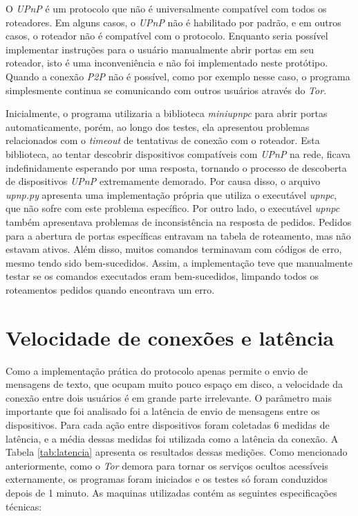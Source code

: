 O \textit{UPnP} é um protocolo que não é universalmente compatível com todos os roteadores. Em alguns casos, o \textit{UPnP} não é habilitado por padrão, e em outros casos, o roteador não é compatível com o protocolo. Enquanto seria possível implementar instruções para o usuário manualmente abrir portas em seu roteador, isto é uma inconveniência e não foi implementado neste protótipo. Quando a conexão \textit{P2P} não é possível, como por exemplo nesse caso, o programa simplesmente continua se comunicando com outros usuários através do \textit{Tor}.

Inicialmente, o programa utilizaria a biblioteca \textit{miniupnpc} para abrir portas automaticamente, porém, ao longo dos testes, ela apresentou problemas relacionados com o \textit{timeout} de tentativas de conexão com o roteador. Esta biblioteca, ao tentar descobrir dispositivos compatíveis com \textit{UPnP} na rede, ficava indefinidamente esperando por uma resposta, tornando o processo de descoberta de dispositivos \textit{UPnP} extremamente demorado. Por causa disso, o arquivo \textit{upnp.py} apresenta uma implementação própria que utiliza o executável \textit{upnpc}, que não sofre com este problema específico. Por outro lado, o executável \textit{upnpc} também apresentava problemas de inconsistência na resposta de pedidos. Pedidos para a abertura de portas específicas entravam na tabela de roteamento, mas não estavam ativos. Além disso, muitos comandos terminavam com códigos de erro, mesmo tendo sido bem-sucedidos. Assim, a implementação teve que manualmente testar se os comandos executados eram bem-sucedidos, limpando todos os roteamentos pedidos quando encontrava um erro.

\section{Velocidade de conexões e latência}

Como a implementação prática do protocolo apenas permite o envio de mensagens de texto, que ocupam muito pouco espaço em disco, a velocidade da conexão entre dois usuários é em grande parte irrelevante. O parâmetro mais importante que foi analisado foi a latência de envio de mensagens entre os dispositivos. Para cada ação entre dispositivos foram coletadas 6 medidas de latência, e a média dessas medidas foi utilizada como a latência da conexão. A Tabela \ref{tab:latencia} apresenta os resultados dessas medições. Como mencionado anteriormente, como o \textit{Tor} demora para tornar os serviços ocultos acessíveis externamente, os programas foram iniciados e os testes só foram conduzidos depois de 1 minuto. As maquinas utilizadas contém as seguintes especificações técnicas:

